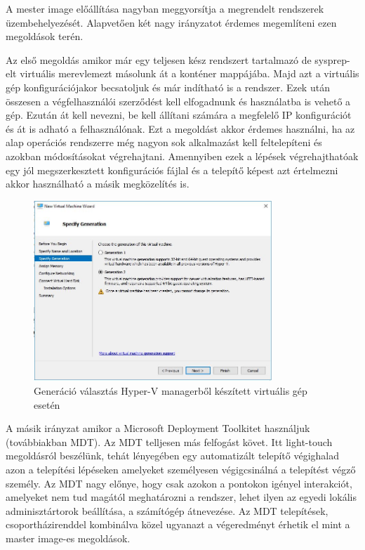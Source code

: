 \documentclass[12pt,oneside,justify,table]{book}
\begin{document}
A mester image előállítása nagyban meggyorsítja a megrendelt rendszerek üzembehelyezését. Alapvetően két nagy irányzatot érdemes megemlíteni ezen megoldások terén. 

Az első megoldás amikor már egy teljesen kész rendszert tartalmazó de sysprep-elt virtuális merevlemezt másolunk át a konténer mappájába. Majd azt a virtuális gép konfigurációjakor becsatoljuk és már indítható is a rendszer. Ezek után összesen a végfelhasználói szerződést kell elfogadnunk és használatba is vehető a gép. Ezután át kell nevezni, be kell állítani számára a megfelelő IP konfigurációt és át is adható a felhasználónak.
Ezt a megoldást akkor érdemes használni, ha az alap operációs rendszerre még nagyon sok alkalmazást kell feltelepíteni és azokban módosításokat végrehajtani. Amennyiben ezek a lépések végrehajthatóak egy jól megszerkesztett konfigurációs fájlal és a telepítő képest azt értelmezni akkor használható a másik megközelítés is.  

 
\begin{figure}[ht]
\centering
\includegraphics[width=0.8\textwidth]{generation_selection}
\caption{Generáció választás Hyper-V managerből készített virtuális gép esetén}
\label{fig:gen_selection}
\end{figure}


A másik irányzat amikor a Microsoft Deployment Toolkitet használjuk (továbbiakban MDT). Az MDT telljesen más felfogást követ. Itt light-touch megoldásról beszélünk, tehát lényegében egy automatizált telepítő végighalad azon a telepítési lépéseken amelyeket személyesen végigcsinálná a telepítést végző személy. 
Az MDT nagy előnye, hogy csak azokon a pontokon igényel interakciót, amelyeket nem tud magától meghatározni a rendszer, lehet ilyen az egyedi lokális adminisztártorok beállítása, a számítógép átnevezése. Az MDT telepítések, csoportházirenddel kombinálva közel ugyanazt a végeredményt érhetik el mint a master image-es megoldások. 
\end{document}

